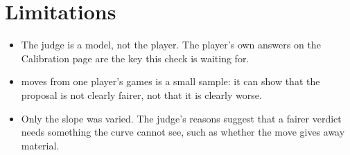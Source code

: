\documentclass[11pt]{article}
\begin{document}
\section{Limitations}

\begin{itemize}[nosep]
\item The judge is a model, not the player. The player's own answers on the Calibration page
are the key this check is waiting for.
\item \JudgeMoves{} moves from one player's games is a small sample: it can show that the
proposal is not clearly fairer, not that it is clearly worse.
\item Only the slope was varied. The judge's reasons suggest that a fairer verdict needs
something the curve cannot see, such as whether the move gives away material.
\end{itemize}
\end{document}

